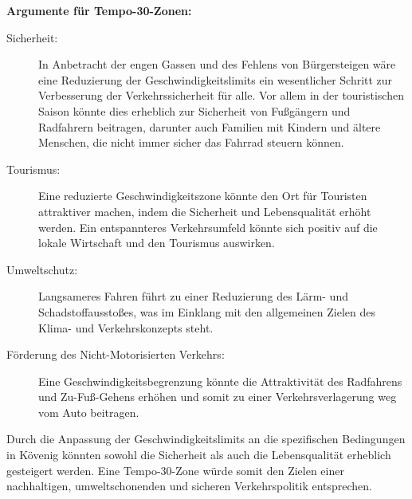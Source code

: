 \textbf{Argumente für Tempo-30-Zonen:}
\begin{description}
\item[Sicherheit:] In Anbetracht der engen Gassen und des Fehlens von Bürgersteigen wäre eine Reduzierung der Geschwindigkeitslimits ein wesentlicher Schritt zur Verbesserung der Verkehrssicherheit für alle. Vor allem in der touristischen Saison könnte dies erheblich zur Sicherheit von Fußgängern und Radfahrern beitragen, darunter auch Familien mit Kindern und ältere Menschen, die nicht immer sicher das Fahrrad steuern können.

\item[Tourismus:] Eine reduzierte Geschwindigkeitszone könnte den Ort für Touristen attraktiver machen, indem die Sicherheit und Lebensqualität erhöht werden. Ein entspannteres Verkehrsumfeld könnte sich positiv auf die lokale Wirtschaft und den Tourismus auswirken.

\item[Umweltschutz:] Langsameres Fahren führt zu einer Reduzierung des Lärm- und Schadstoffausstoßes, was im Einklang mit den allgemeinen Zielen des Klima- und Verkehrskonzepts steht.

\item[Förderung des Nicht-Motorisierten Verkehrs:] Eine Geschwindigkeitsbegrenzung könnte die Attraktivität des Radfahrens und Zu-Fuß-Gehens erhöhen und somit zu einer Verkehrsverlagerung weg vom Auto beitragen.
\end{description}
Durch die Anpassung der Geschwindigkeitslimits an die spezifischen Bedingungen in Kövenig könnten sowohl die Sicherheit als auch die Lebensqualität erheblich gesteigert werden. Eine Tempo-30-Zone würde somit den Zielen einer nachhaltigen, umweltschonenden und sicheren Verkehrspolitik entsprechen.

